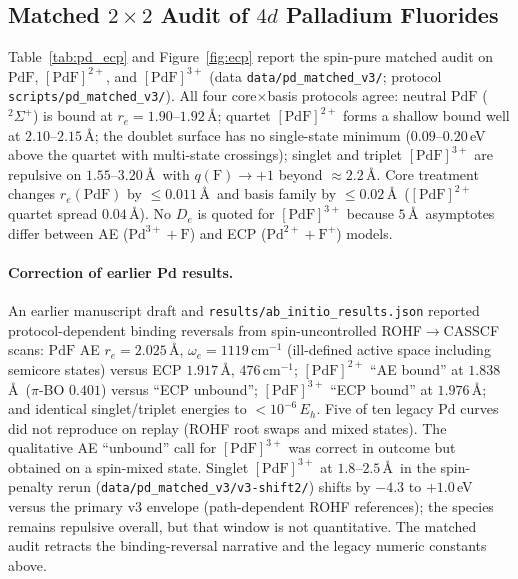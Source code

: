 \documentclass[10pt,twocolumn]{article}
\begin{document}
\subsection{Matched $2\times 2$ Audit of $4d$ Palladium Fluorides}
Table~\ref{tab:pd_ecp} and Figure~\ref{fig:ecp} report the spin-pure matched audit on $\mathrm{PdF}$, $[\mathrm{PdF}]^{2+}$, and $[\mathrm{PdF}]^{3+}$ (data \texttt{data/pd\_matched\_v3/}; protocol \texttt{scripts/pd\_matched\_v3/}). All four core$\times$basis protocols agree: neutral $\mathrm{PdF}$ ($^2\Sigma^+$) is bound at $r_e = 1.90$--$1.92\,$\AA; quartet $[\mathrm{PdF}]^{2+}$ forms a shallow bound well at $2.10$--$2.15\,$\AA; the doublet surface has no single-state minimum ($0.09$--$0.20\,$eV above the quartet with multi-state crossings); singlet and triplet $[\mathrm{PdF}]^{3+}$ are repulsive on $1.55$--$3.20\,$\AA\ with $q(\mathrm{F}) \to +1$ beyond $\approx 2.2\,$\AA. Core treatment changes $r_e(\mathrm{PdF})$ by $\le 0.011\,$\AA\ and basis family by $\le 0.02\,$\AA\ ($[\mathrm{PdF}]^{2+}$ quartet spread $0.04\,$\AA). No $D_e$ is quoted for $[\mathrm{PdF}]^{3+}$ because $5\,$\AA\ asymptotes differ between AE ($\mathrm{Pd}^{3+}+\mathrm{F}$) and ECP ($\mathrm{Pd}^{2+}+\mathrm{F}^{+}$) models.

\paragraph{Correction of earlier Pd results.}
An earlier manuscript draft and \texttt{results/ab\_initio\_results.json} reported protocol-dependent binding reversals from spin-uncontrolled ROHF$\to$CASSCF scans: $\mathrm{PdF}$ AE $r_e = 2.025\,$\AA, $\omega_e = 1119\,\mathrm{cm}^{-1}$ (ill-defined active space including semicore states) versus ECP $1.917\,$\AA, $476\,\mathrm{cm}^{-1}$; $[\mathrm{PdF}]^{2+}$ ``AE bound'' at $1.838\,$\AA\ ($\pi$-BO $0.401$) versus ``ECP unbound''; $[\mathrm{PdF}]^{3+}$ ``ECP bound'' at $1.976\,$\AA; and identical singlet/triplet energies to $<10^{-6}\,E_h$. Five of ten legacy Pd curves did not reproduce on replay (ROHF root swaps and mixed states). The qualitative AE ``unbound'' call for $[\mathrm{PdF}]^{3+}$ was correct in outcome but obtained on a spin-mixed state. Singlet $[\mathrm{PdF}]^{3+}$ at $1.8$--$2.5\,$\AA\ in the spin-penalty rerun (\texttt{data/pd\_matched\_v3/v3-shift2/}) shifts by $-4.3$ to $+1.0\,$eV versus the primary v3 envelope (path-dependent ROHF references); the species remains repulsive overall, but that window is not quantitative. The matched audit retracts the binding-reversal narrative and the legacy numeric constants above.
\end{document}
